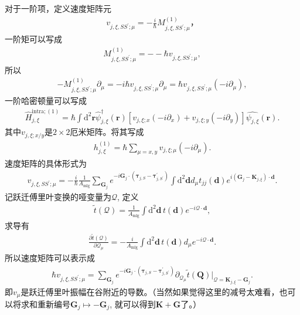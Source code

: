 \documentclass[10pt, oneside]{article}
\begin{document}
对于一阶项，定义速度矩阵元
\begin{align}
	v_{j,\xi, S S^{\prime}; \mu} = - \frac{i }{\hbar} M_{j,\xi, S S^{\prime}; \mu}^{\left(1\right)}，
\end{align}
一阶矩可以写成
\begin{align}
	M_{j,\xi, S S^{\prime}; \mu}^{\left(1\right)} = - - \hbar v_{j,\xi, S S^{\prime}; \mu} ,
\end{align}
所以
\begin{align}
	- M_{j,\xi, S S^{\prime}; \mu}^{\left(1\right)} \partial_{\mu} = -i \hbar v_{j,\xi, S S^{\prime}; \mu} \partial_{\mu} = \hbar v_{j,\xi, S S^{\prime}; \mu} \left(-i \partial_{\mu}	\right),
\end{align}
一阶哈密顿量可以写成
\begin{align}
	\hat{H }^{\mathrm{intra}; \left(1\right)} _{j,\xi} = \hbar \int \mathrm{d}^{2} \bm{r}  \hat{\psi}^{\dagger}_{j,\xi} \left(\bm{r}\right) \left[v_{j,\xi;x } \left(-i \partial_{x }\right) + v_{j,\xi;y} \left(-i \partial_{y}\right)\right] \hat{\psi_{j,\xi}} \left(\bm{r}\right).
\end{align}
其中\(v_{j,\xi;x/y}\)是\(2 \times 2\)厄米矩阵。将其写成
\begin{align}
	h^{\left(1\right)}_{j,\xi} = \hbar \sum_{\mu=x,y} v_{j,\xi;\mu} \left(-i \partial_{\mu}\right). 
\end{align}
速度矩阵的具体形式为
\begin{align}
	\boxed{
		v_{j,\xi, S S^{\prime};\mu} = - \frac{i}{\hbar} \frac{1}{A_{\mathrm{mlg}}} \sum_{\bm{G}_{j}} e^{-i \bm{G}_{j} \cdot \left(\bm{\tau}_{j,S} - \bm{\tau}^{\prime}_{j,S^{\prime}}\right)} \int \mathrm{d}^{2} \bm{d } d_{\mu} t_{jj} \left(\bm{d }\right)  e^{i \left(\bm{G}_{j} - \bm{K }_{j,\xi} \right) \cdot \bm{d }}.
	}
\end{align}
记跃迁傅里叶变换的哑变量为\(\mathcal{Q }\), 定义
\begin{align}
	\tilde{t } \left(\mathcal{Q}\right) = \frac{1}{A_{\mathrm{mlg}}} \int \mathrm{d}^{2} \bm{d } \, t \left(\bm{d }\right) e^{-i \mathcal{Q }\cdot\bm{d }},
\end{align}
求导有
\begin{align}
	\frac{\partial \tilde{t } \left(\mathcal{Q}\right) }{\partial \mathcal{Q }_{\mu}} = - \frac{i }{A_{\mathrm{mlg}}} \int \mathrm{d}^{2} \bm{d } \, t \left(\bm{d }\right) d_{\mu} e^{-i \mathcal{Q }\cdot\bm{d }}.
\end{align}
所以速度矩阵可以表示成
\begin{align}
	\hbar v_{j,\xi,SS^{\prime};\mu} =  \sum_{\bm{G}_{j}}  e^{-i \bm{G}_{j} \cdot \left(\bm{\tau}_{j,S} - \bm{\tau}^{\prime}_{j,S^{\prime}}\right)} \partial_{\mathcal{Q }_{\mu}} \tilde{ t } \left(\bm{Q }\right) \bigg|_{\mathcal{Q } = \bm{K}_{j,\xi} - \bm{G}_{j}}.
\end{align}
即\(v_{\mu}\)是跃迁傅里叶振幅在谷附近的导数。（当然如果觉得这里的减号太难看，也可以将求和重新编号\(\bm{G}_j \mapsto - \bm{G}_{j}\), 就可以得到\(\bm{K} + \bm{G }\)了。）
\end{document}
